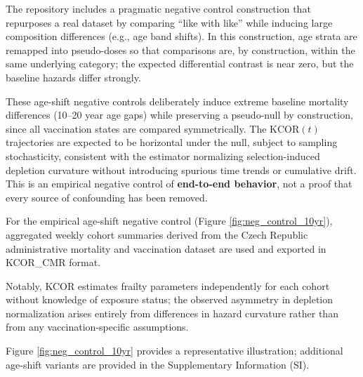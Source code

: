 \documentclass[
]{article}
\begin{document}
The repository includes a pragmatic negative control construction that
repurposes a real dataset by comparing ``like with like'' while inducing
large composition differences (e.g., age band shifts). In this
construction, age strata are remapped into pseudo-doses so that
comparisons are, by construction, within the same underlying category;
the expected differential contrast is near zero, but the baseline
hazards differ strongly.

These age-shift negative controls deliberately induce extreme baseline
mortality differences (10--20 year age gaps) while preserving a
pseudo-null by construction, since all vaccination states are compared
symmetrically. The \(\mathrm{KCOR}(t)\) trajectories are expected to be
horizontal under the null, subject to sampling stochasticity, consistent
with the estimator normalizing selection-induced depletion curvature
without introducing spurious time trends or cumulative drift. This is an
empirical negative control of \textbf{end-to-end behavior}, not a proof
that every source of confounding has been removed.

For the empirical age-shift negative control (Figure
\ref{fig:neg_control_10yr}), aggregated weekly cohort summaries derived
from the Czech Republic administrative mortality and vaccination dataset
are used and exported in KCOR\_CMR format.

Notably, KCOR estimates frailty parameters independently for each cohort
without knowledge of exposure status; the observed asymmetry in
depletion normalization arises entirely from differences in hazard
curvature rather than from any vaccination-specific assumptions.

Figure \ref{fig:neg_control_10yr} provides a representative
illustration; additional age-shift variants are provided in the
Supplementary Information (SI).
\end{document}
